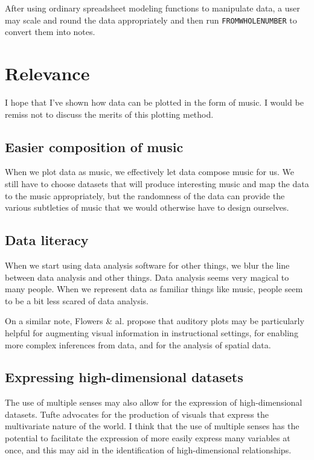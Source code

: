 \documentclass{acm_proc_article-sp}
\begin{document}
After using ordinary spreadsheet modeling functions to manipulate data,
a user may scale and round the data appropriately and then run
\texttt{FROMWHOLENUMBER} to convert them into notes.

\section{Relevance}
I hope that I've shown how data can be plotted in the form of music.
I would be remiss not to discuss the merits of this plotting method.

\subsection{Easier composition of music}
When we plot data as music, we effectively let data compose music for us.
We still have to choose datasets that will produce interesting music and
map the data to the music appropriately, but the randomness of the data
can provide the various subtleties of music that we would otherwise have
to design ourselves.

\subsection{Data literacy}
When we start using data analysis software for other things,
we blur the line between data analysis and other things.
Data analysis seems very magical to many people. When we represent
data as familiar things like music, people seem to be a bit less
scared of data analysis.

On a similar note,
Flowers \& al. \cite{flowers2005} propose that auditory plots may be
particularly helpful for augmenting visual information in instructional
settings, for enabling more complex inferences from data, and for
the analysis of spatial data.

\subsection{Expressing high-dimensional datasets}
The use of multiple senses may also allow for the expression of
high-dimensional datasets. Tufte advocates for the production of
visuals that express the multivariate nature of the world.\cite{tufte}
I think that the use of multiple senses has the potential to
facilitate the expression of more easily express many variables at
once, and this may aid in the identification of high-dimensional
relationships.



\balancecolumns
\end{document}
